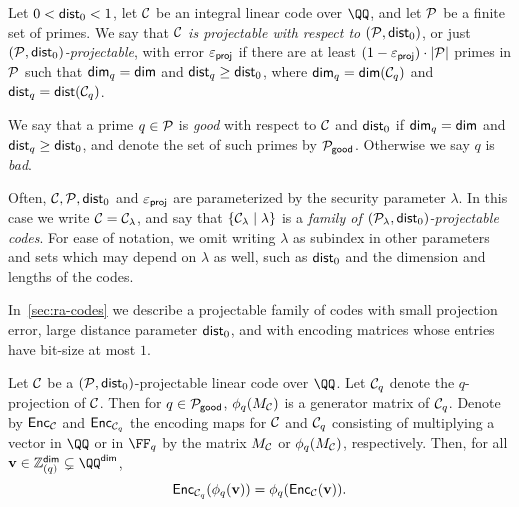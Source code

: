 \documentclass[11pt,letterpaper,usenames,dvipsnames]{article}
\begin{document}
\begin{definition}\label{d: projectable code}
Let $0<\mathsf{dist}_0<1$, let $\mathcal{C}$ be an integral linear code over $\QQ$, and let $\mathcal{P}$ be a finite set of primes. We say that \emph{$\mathcal{C}$ is projectable with respect to $(\mathcal{P}, \mathsf{dist}_0)$}, or just \emph{$(\mathcal{P}, \mathsf{dist}_0)$-projectable}, with error $\varepsilon_{\mathsf{proj}}$ if there are at least $(1-\varepsilon_{\mathsf{proj}})\cdot |\mathcal{P}|$ primes in $\mathcal{P}$ such that $\mathsf{dim}_q=\mathsf{dim}$ and $\mathsf{dist}_q \geq \mathsf{dist}_0$, where $\mathsf{dim}_q= \mathsf{dim}(\mathcal{C}_q)$ and $\mathsf{dist}_q=\mathsf{dist}(\mathcal{C}_q)$.

We say that a prime $q\in \mathcal{P}$ is \emph{good} with respect to $\mathcal{C}$ and $\mathsf{dist}_0$ if $\mathsf{dim}_q=\mathsf{dim}$ and $\mathsf{dist}_q \geq \mathsf{dist}_0$, and denote the set of such primes by $\mathcal{P}_{\mathsf{good}}$. Otherwise we say $q$ is \emph{bad}.

Often, $\mathcal{C}, \mathcal{P}, \mathsf{dist}_0$ and $\varepsilon_{\mathsf{proj}}$ are parameterized by the security parameter $\lambda.$ In this case we write $\mathcal{C}={\mathcal{C}_{\lambda}}$, and say that $\{{\mathcal{C}_{\lambda}}\mid \lambda\}$ is a \emph{family  of $({\mathcal{P}_{\lambda}},\mathsf{dist}_0)$-projectable codes}. For ease of notation, we omit writing $\lambda$ as subindex in other parameters and sets which may depend on $\lambda$ as well, such as $\mathsf{dist}_0$ and the dimension and lengths of the codes.
\end{definition}
  
In~\cref{sec:ra-codes} we describe a projectable family of codes with small projection error, large distance parameter $\mathsf{dist}_0$, and with encoding matrices whose entries have bit-size at most $1$.
  
\begin{lemma}
\label{lemma:projectable-code-commutativity}
Let $\mathcal{C}$ be a $(\mathcal{P}, \mathsf{dist}_0)$-projectable linear code over $\QQ$. Let $\mathcal{C}_q$ denote the $q$-projection of $\mathcal{C}$. Then for $q \in \mathcal{P}_{\mathsf{good}}$, $\phi_q(M_{\mathcal{C}})$ is a generator matrix of $\mathcal{C}_q$. Denote by $\mathsf{Enc}_{\mathcal{C}}$ and $\mathsf{Enc}_{\mathcal{C}_q}$ the encoding maps for $\mathcal{C}$ and $\mathcal{C}_q$ consisting of multiplying a vector in $\QQ$ or in $\FF_q$ by the matrix $M_{\mathcal{C}}$ or $\phi_q(M_{\mathcal{C}})$, respectively. Then, for all $\vv\in \ZZ_{(q)}^\codedim\subsetneq \QQ^\codedim$, 
\[
\mathsf{Enc}_{\mathcal{C}_q}(\phi_q(\mathbf{v})) = \phi_q(\mathsf{Enc}_{\mathcal{C}}(\mathbf{v})).
\]
\end{lemma}
\end{document}
